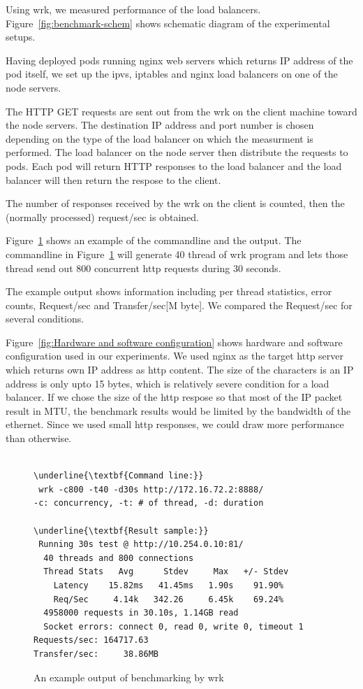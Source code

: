 Using wrk, we measured performance of the load balancers.
Figure~\ref{fig:benchmark-schem} shows schematic diagram of the experimental setups.

Having deployed pods running nginx web servers which returns IP address of the pod itself,
we set up the ipvs, iptables and nginx load balancers on one of the node servers. 

The HTTP GET requests are sent out from the wrk on the client machine toward the node servers.
The destination IP address and port number is chosen 
depending on the type of the load balancer on which the measurment is performed.
The load balancer on the node server then distribute the requests to pods.
Each pod will return HTTP responses to the load balancer and the load balancer will then return the respose to the client.

The number of responses received by the wrk on the client is counted, 
then the (normally processed) request/sec is obtained. 

Figure~\ref{fig:benchmark example} shows an example of the commandline and the output.
The commandline in Figure~\ref{fig:benchmark example} will generate 40 thread of wrk program 
and lets those thread send out 800 concurrent http requests during 30 seconds.

The example output shows information including per thread statistics, error counts, Request/sec and Transfer/sec[M byte].
We compared the Request/sec for several conditions.

Figure~\ref{fig:Hardware and software configuration} shows hardware and software configuration used in our experiments.
We used nginx as the target http server which returns own IP address as http content. 
The size of the characters is an IP address is only upto 15 bytes, 
which is relatively severe condition for a load balancer.
If we chose the size of the http respose so that most of the IP packet result in MTU,
the benchmark results would be limited by the bandwidth of the ethernet.
Since we used small http responses, we could draw more performance than otherwise.

\begin{figure}
\begin{minipage}{\columnwidth}
\small
\begin{Verbatim}[commandchars=\\\{\}]

\underline{\textbf{Command line:}}
 wrk -c800 -t40 -d30s http://172.16.72.2:8888/
-c: concurrency, -t: # of thread, -d: duration

\underline{\textbf{Result sample:}}
 Running 30s test @ http://10.254.0.10:81/
  40 threads and 800 connections
  Thread Stats   Avg      Stdev     Max   +/- Stdev
    Latency    15.82ms   41.45ms   1.90s    91.90%
    Req/Sec     4.14k   342.26     6.45k    69.24%
  4958000 requests in 30.10s, 1.14GB read
  Socket errors: connect 0, read 0, write 0, timeout 1
Requests/sec: 164717.63
Transfer/sec:     38.86MB

\end{Verbatim}
\end{minipage}
\caption{An example output of benchmarking by wrk}
\label{fig:benchmark example}
\end{figure}

